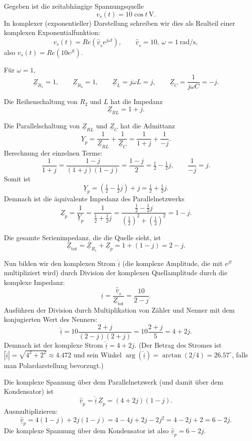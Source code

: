 \documentclass[11pt,a4paper]{article}
\newif\ifshowsolutions
\newenvironment{solution}
  {\ifshowsolutions
     \begin{tcolorbox}[enhanced, breakable, width=\textwidth,
       colback=green!5!white,colframe=green!50!black,
       fonttitle=\bfseries\large,
       title=Lösung]}
  {\end{tcolorbox}\fi}
\begin{document}
\ifshowsolutions
\begin{solution}
Gegeben ist die zeitabhängige Spannungsquelle
\[
v_s(t) = 10\cos t\,\text{V}.
\]
In komplexer (exponentieller) Darstellung schreiben wir dies als Realteil einer komplexen Exponentialfunktion:
\[
v_s(t) = Re(\underline{\hat{v}}_s e^{j\omega t}),\qquad \underline{\hat{v}}_s = 10,\ \omega=1\ \text{rad/s},
\]
also \(v_s(t)=Re(10 e^{j t})\).

Für \(\omega=1\),
\[
\underline{Z}_{R_1} = 1,\qquad \underline{Z}_{R_2} = 1,\qquad \underline{Z}_L = j\omega L = j,\qquad \underline{Z}_C = \frac{1}{j\omega C} = -j.
\]

Die Reihenschaltung von \(R_2\) und \(L\) hat die Impedanz
\[
\underline{Z}_{RL}=1+j.
\]

Die Parallelschaltung von \(\underline{Z}_{RL}\) und \(\underline{Z}_C\) hat die Admittanz
\[
\underline{Y}_{p} = \frac{1}{\underline{Z}_{RL}} + \frac{1}{\underline{Z}_C} = \frac{1}{1+j} + \frac{1}{-j}.
\]
Berechnung der einzelnen Terme:
\[
\frac{1}{1+j} = \frac{1-j}{(1+j)(1-j)} = \frac{1-j}{2} = \tfrac12 - \tfrac12 j,
\qquad
\frac{1}{-j} = j.
\]
Somit ist
\[
\underline{Y}_p = \left(\tfrac12 - \tfrac12 j\right) + j = \tfrac12 + \tfrac12 j.
\]
Demnach ist die äquivalente Impedanz des Parallelnetzwerks
\[
\underline{Z}_p = \frac{1}{\underline{Y}_p} = \frac{1}{\tfrac12 + \tfrac12 j} = \frac{\tfrac12 - \tfrac12 j}{(\tfrac12)^2 + (\tfrac12)^2} = 1-j.
\]

Die gesamte Serienimpedanz, die die Quelle sieht, ist
\[
\underline{Z}_{\text{tot}} = \underline{Z}_{R_1} + \underline{Z}_p = 1+(1-j) = 2-j.
\]

Nun bilden wir den komplexen Strom \(\underline{\hat{i}}\) (die komplexe Amplitude, die mit \(e^{j t}\) multipliziert wird) durch Division der komplexen Quellamplitude durch die komplexe Impedanz:
\[
\underline{\hat{i}} = \frac{\underline{\hat{v}}_s}{\underline{Z}_{\text{tot}}} = \frac{10}{2-j}.
\]
Ausführen der Division durch Multiplikation von Zähler und Nenner mit dem konjugierten Wert des Nenners:
\[
\underline{\hat{i}} = 10\frac{2+j}{(2-j)(2+j)} = 10\frac{2+j}{5} = 4+2j.
\]
Demnach ist der komplexe Strom \(\underline{\hat{i}} = 4+2j\). (Der Betrag des Stromes ist \(|\underline{\hat{i}}| = \sqrt{4^2+2^2} \approx 4.472\) und sein Winkel \(\arg(\underline{\hat{i}}) = \arctan(2/4) = 26.57^\circ\), falls man Polardarstellung bevorzugt.)

Die komplexe Spannung über dem Parallelnetzwerk (und damit über dem Kondensator) ist
\[
\underline{\hat{v}}_p = \underline{\hat{i}}\,\underline{Z}_p = (4+2j)(1-j).
\]
Ausmultiplizieren:
\[
\underline{\hat{v}}_p = 4(1-j)+2j(1-j) = 4-4j+2j-2j^2 = 4-2j+2 = 6-2j.
\]
Die komplexe Spannung über dem Kondensator ist also \(\underline{\hat{v}}_p = 6-2j\).


\end{solution}
\end{document}
